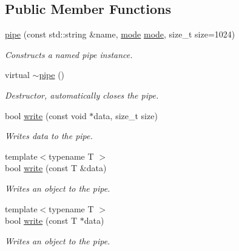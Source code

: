 \subsection*{Public Member Functions}
\begin{DoxyCompactItemize}
\item 
\hyperlink{classcpen333_1_1process_1_1pipe_a87d45160992c6f27c7291ef3a0f118bf}{pipe} (const std\+::string \&name, \hyperlink{classcpen333_1_1process_1_1pipe_a80047f44ba5638538b032efa851c6f3c}{mode} \hyperlink{classcpen333_1_1process_1_1pipe_a80047f44ba5638538b032efa851c6f3c}{mode}, size\+\_\+t size=1024)
\begin{DoxyCompactList}\small\item\em Constructs a named pipe instance. \end{DoxyCompactList}\item 
\mbox{\label{classcpen333_1_1process_1_1pipe_a913c91ae5dce8df7fd836b43d541598f}} 
virtual \hyperlink{classcpen333_1_1process_1_1pipe_a913c91ae5dce8df7fd836b43d541598f}{$\sim$pipe} ()
\begin{DoxyCompactList}\small\item\em Destructor, automatically closes the pipe. \end{DoxyCompactList}\item 
bool \hyperlink{classcpen333_1_1process_1_1pipe_afa2e2598bf72fa411b4b96bbf88d2f4b}{write} (const void $\ast$data, size\+\_\+t size)
\begin{DoxyCompactList}\small\item\em Writes data to the pipe. \end{DoxyCompactList}\item 
{\footnotesize template$<$typename T $>$ }\\bool \hyperlink{classcpen333_1_1process_1_1pipe_aa13d4d9154d30a7d3df953006a4e3019}{write} (const T \&data)
\begin{DoxyCompactList}\small\item\em Writes an object to the pipe. \end{DoxyCompactList}\item 
{\footnotesize template$<$typename T $>$ }\\bool \hyperlink{classcpen333_1_1process_1_1pipe_ab6f8f7992592df4cf0d24307881cd58d}{write} (const T $\ast$data)
\begin{DoxyCompactList}\small\item\em Writes an object to the pipe. \end{DoxyCompactList}\item 

\end{DoxyCompactItemize}
